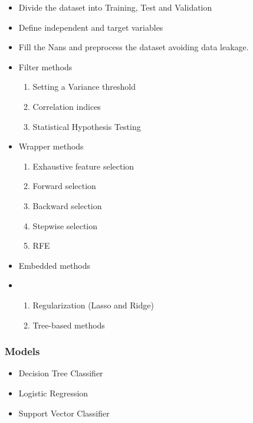 \begin{itemize}
    \item Divide the dataset into Training, Test and Validation
    \item Define independent and target variables
    \item Fill the Nans and preprocess the dataset avoiding data leakage.
    \item Filter methods 
    \begin{enumerate}
        \item Setting a Variance threshold
        \item Correlation indices
        \item Statistical Hypothesis Testing
    \end{enumerate}
    \item Wrapper methods
    \begin{enumerate}
        \item Exhaustive feature selection
        \item Forward selection
        \item Backward selection
        \item Stepwise selection
        \item RFE
    \end{enumerate}
    \item Embedded methods
    \item \begin{enumerate}
        \item Regularization (Lasso and Ridge)
        \item Tree-based methods
    \end{enumerate}
\end{itemize}



\subsubsection{Models}

\begin{itemize}
    \item Decision Tree Classifier
    \item Logistic Regression
    \item Support Vector Classifier
\end{itemize}